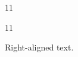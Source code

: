 \documentclass[paper=A4]{ropas-poster}
\begin{document}
\begin{postergrid}{1}{1}
\begin{posterblock}{1}{1}
\begin{flushright}Right-aligned text.\end{flushright}
\end{posterblock}
\end{postergrid}
\end{document}
